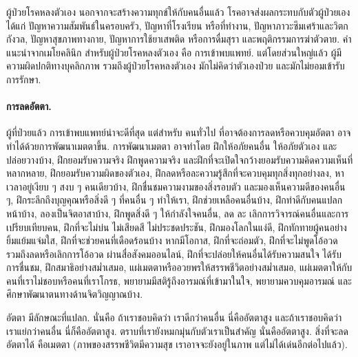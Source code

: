 {\begin{shaded}
ผู้ป่วยโรคหลงตัวเอง นอกจากจะสร้างความทุกข์ให้กับคนอื่นแล้ว
โรคอาจส่งผลกระทบกับตัวผู้ป่วยเอง ได้แก่
ปัญหาความสัมพันธ์ในครอบครัว,
ปัญหาที่โรงเรียน หรือที่ทำงาน,
ปัญหาภาวะซึมเศร้าและวิตกกังวล,
ปัญหาสุขภาพทางกาย,
ปัญหาการใช้ยาเสพติด หรือการดื่มสุรา
และพฤติกรรมการฆ่าตัวตาย.
คำแนะนำจากเมโยคลินิก สำหรับผู้ป่วยโรคหลงตัวเอง คือ การเข้าพบแพทย์. 
แต่โดยส่วนใหญ่แล้ว
ผู้มีความผิดปกติทางบุคลิกภาพ 
รวมถึงผู้ป่วยโรคหลงตัวเอง มักไม่คิดว่าตัวเองป่วย และมักไม่ยอมเข้ารับการรักษา.

\paragraph{การลดอัตตา.}
ผู้ที่ป่วยแล้ว การเข้าพบแพทย์น่าจะดีที่สุด
แต่สำหรับ คนทั่วไป ที่อาจต้องการลดหรือควบคุมอัตตา
อาจทำได้ด้วยการพัฒนาเมตตาขึ้น.
การพัฒนาเมตตา อาจทำโดย
ฝึกให้อภัยคนอื่น ให้อภัยตัวเอง และปล่อยวางบ้าง,
ฝึกยอมรับความจริง ฝึกพูดความจริง และฝึกที่จะเปิดใจกว้างยอมรับความคิดความเห็นที่หลากหลาย,
ฝึกยอมรับความผิดของตัวเอง,
ฝึกลดหรือละความรู้สึกที่จะควบคุมทุกสิ่งทุกอย่างลง,
หาเวลาอยู่เงียบ ๆ สงบ ๆ คนเดียวบ้าง,
ฝึกชื่นชมความงามของสิ่งรอบตัว และมองเห็นความดีของคนอื่น ๆ,
ฝึกระลึกถึงบุญคุณหรือสิ่งดี ๆ ที่คนอื่น ๆ ทำให้เรา,
ฝึกช่วยเหลือคนอื่นบ้าง,
ฝึกทำดีกับคนแปลกหน้าบ้าง,
ลองเป็นจิตอาสาบ้าง,
ฝึกพูดสิ่งดี ๆ ให้กำลังใจคนอื่น,
ลด ละ เลิกการวิจารณ์คนอื่นและการเปรียบเทียบคน,
ฝึกที่จะไม่บ่น ไม่เสียดสี ไม่ประชดประชัน,
ฝึกมองโลกในแง่ดี,
ฝึกทักทายผู้คนอย่างยิ้มแย้มแจ่มใส,
ฝึกที่จะช่วยคนที่เดือดร้อนบ้าง หากมีโอกาส,
ฝึกที่จะถ่อมตัว,
ฝึกที่จะไม่พูดโอ้อวด รวมถึงลดหรือเลิกการโอ้อวด ผ่านสื่อสังคมออนไลน์,
ฝึกที่จะปล่อยให้คนอื่นได้รับความสนใจ ได้รับการชื่นชม,
ฝึกสมาธิอย่างสม่ำเสมอ,
แผ่เมตตาหรืออวยพรให้สรรพชีวิตอย่างสม่ำเสมอ,
แผ่เมตตาให้กับคนที่เราไม่ชอบหรือคนที่เราโกรธ,
พยายามมีสติรู้ถึงอารมณ์ที่เข้ามาในใจ,
พยายามควบคุมอารมณ์
และศึกษาพัฒนาตนทางด้านจิตวิญญาณบ้าง.

อัตตา มีลักษณะที่แปลก.
นั่นคือ ถ้าเราชอบคิดว่า เราดีกว่าคนอื่น นี่คืออัตตาสูง
และถ้าเราชอบคิดว่า เราแย่กว่าคนอื่น นี่ก็คืออัตตาสูง.
ตราบที่เรายังหมกมุ่นกับตัวเราเป็นสำคัญ นั่นคืออัตตาสูง.
สิ่งที่จะลดอัตตาได้ คือเมตตา (ภาพของสรรพชีวิตมีความสุข เราอาจจะยังอยู่ในภาพ แต่ไม่ได้เด่นอีกต่อไปแล้ว).


\end{shaded}}
